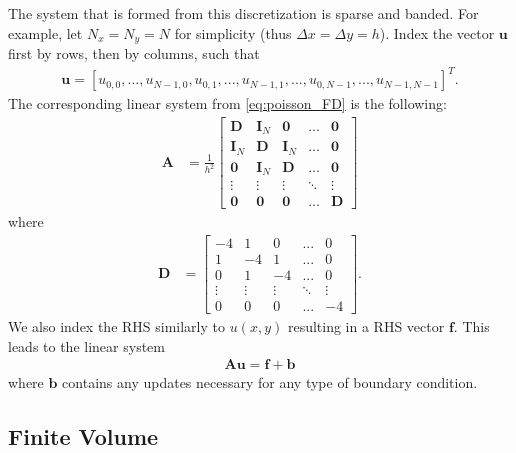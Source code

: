 The system that is formed from this discretization is sparse and banded. For example, let $N_x = N_y = N$ for simplicity (thus $\Delta x = \Delta y = h$). Index the vector $\textbf{u}$ first by rows, then by columns, such that
\begin{align}
    \textbf{u} = [u_{0,0}, ..., u_{N - 1, 0}, u_{0, 1}, ..., u_{N - 1, 1}, ..., u_{0, N - 1}, ..., u_{N - 1, N - 1}]^T.
\end{align}
The corresponding linear system from \ref{eq:poisson_FD} is the following:
\begin{align}
    \textbf{A} &= \frac{1}{h^2}
    \begin{bmatrix}
        \textbf{D} & \textbf{I}_{N} & \textbf{0} & ... & \textbf{0} \\
        \textbf{I}_{N} & \textbf{D} & \textbf{I}_{N} & ... & \textbf{0} \\
        \textbf{0} & \textbf{I}_{N} & \textbf{D} & ... & \textbf{0} \\
        \vdots & \vdots & \vdots & \ddots & \vdots \\
        \textbf{0} & \textbf{0} & \textbf{0} & ... & \textbf{D}
    \end{bmatrix}
\end{align}
where
\begin{align}
    \textbf{D} &= 
    \begin{bmatrix}
        -4 & 1 & 0 & ... & 0 \\
        1 & -4 & 1 & ... & 0 \\
        0 & 1 & -4 & ... & 0 \\
        \vdots & \vdots & \vdots & \ddots & \vdots \\
        0 & 0 & 0 & ... & -4
    \end{bmatrix}.
\end{align}
We also index the RHS similarly to $u(x,y)$ resulting in a RHS vector $\textbf{f}$. This leads to the linear system
\begin{align}
    \textbf{A} \textbf{u} = \textbf{f} + \textbf{b}
\end{align}
where $\textbf{b}$ contains any updates necessary for any type of boundary condition.

\subsection{Finite Volume}

